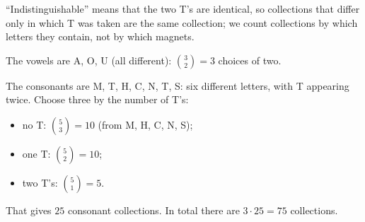 ``Indistinguishable'' means that the two T's are identical, so collections that differ only in which T was taken are the same collection; we count collections by which letters they contain, not by which magnets.

The vowels are A, O, U (all different): $\binom32=3$ choices of two.

The consonants are M, T, H, C, N, T, S: six different letters, with T appearing twice. Choose three by the number of T's:
\begin{itemize}
\item no T: $\binom53=10$ (from M, H, C, N, S);
\item one T: $\binom52=10$;
\item two T's: $\binom51=5$.
\end{itemize}
That gives $25$ consonant collections. In total there are $3\cdot25=\boxed{75}$ collections.
